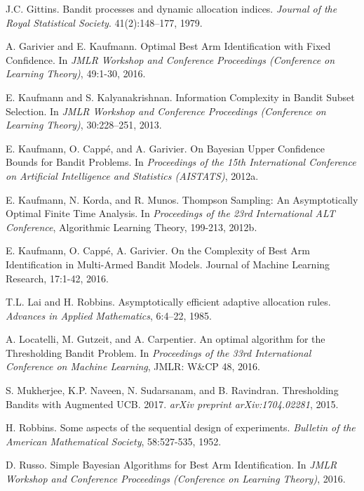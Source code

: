 \documentclass[11pt,]{article}
\begin{document}
J.C. Gittins. Bandit processes and dynamic allocation indices.
\emph{Journal of the Royal Statistical Society}. 41(2):148--177,
1979.\par

A. Garivier and E. Kaufmann. Optimal Best Arm Identification with Fixed
Confidence. In \emph{JMLR Workshop and Conference Proceedings
(Conference on Learning Theory)}, 49:1-30, 2016.\par

E. Kaufmann and S. Kalyanakrishnan. Information Complexity in Bandit
Subset Selection. In \emph{JMLR Workshop and Conference Proceedings
(Conference on Learning Theory)}, 30:228--251, 2013.\par

E. Kaufmann, O. Cappé, and A. Garivier. On Bayesian Upper Confidence
Bounds for Bandit Problems. In \emph{Proceedings of the 15th
International Conference on Artificial Intelligence and Statistics
(AISTATS)}, 2012a.\par

E. Kaufmann, N. Korda, and R. Munos. Thompson Sampling: An
Asymptotically Optimal Finite Time Analysis. In \emph{Proceedings of the
23rd International ALT Conference}, Algorithmic Learning Theory,
199-213, 2012b.

E. Kaufmann, O. Cappé, A. Garivier. On the Complexity of Best Arm
Identification in Multi-Armed Bandit Models. Journal of Machine Learning
Research, 17:1-42, 2016.\par

T.L. Lai and H. Robbins. Asymptotically efficient adaptive allocation
rules. \emph{Advances in Applied Mathematics}, 6:4--22, 1985.\par

A. Locatelli, M. Gutzeit, and A. Carpentier. An optimal algorithm for
the Thresholding Bandit Problem. In \emph{Proceedings of the 33rd
International Conference on Machine Learning}, JMLR: W\&CP 48, 2016.\par

S. Mukherjee, K.P. Naveen, N. Sudarsanam, and B. Ravindran. Thresholding
Bandits with Augmented UCB. 2017. \emph{arXiv preprint
arXiv:1704.02281}, 2015.\par

H. Robbins. Some aspects of the sequential design of experiments.
\emph{Bulletin of the American Mathematical Society}, 58:527-535,
1952.\par

D. Russo. Simple Bayesian Algorithms for Best Arm Identification. In
\emph{JMLR Workshop and Conference Proceedings (Conference on Learning
Theory)}, 2016.\par
\end{document}
